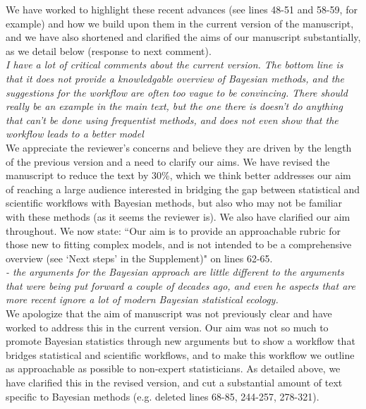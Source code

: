 \documentclass[11pt,a4paper]{article}
\begin{document}
We have worked to highlight these recent advances (see lines 48-51 and 58-59, for example) and how we build upon them in the current version of the manuscript, and we have also shortened and clarified the aims of our manuscript substantially, as we detail below (response to next comment).\\

\emph{I have a lot of critical comments about the current version. The bottom line is that it does not provide a knowledgable overview of Bayesian methods, and the suggestions for the workflow are often too vague to be convincing. There should really be an example in the main text, but the one there is doesn't do anything that can't be done using frequentist methods, and does not even show that the workflow leads to a better model}\\

We appreciate the reviewer's concerns and believe they are driven by the length of the previous version and a need to clarify our aims. We have revised the manuscript to reduce the text by 30\%, which we think better addresses our aim of reaching a large audience interested in bridging the gap between statistical and scientific workflows with Bayesian methods, but also who may not be familiar with these methods (as it seems the reviewer is). We also have clarified our aim throughout.  We now state: ``Our
aim is to provide an approachable rubric for those new to fitting complex models, and is not intended to be a comprehensive overview (see ‘Next steps’ in the Supplement)" on lines 62-65.\\

\emph{- the arguments for the Bayesian approach are little different to the arguments that were being put forward a couple of decades ago, and even he aspects that are more recent ignore a lot of modern Bayesian statistical ecology.}\\

We apologize that the aim of manuscript was not previously clear and have worked to address this in the current version. Our aim was not so much to promote Bayesian statistics through new arguments but to show a workflow that bridges statistical and scientific workflows, and to make this workflow we outline as approachable as possible to non-expert statisticians. As detailed above, we have clarified this in the revised version, and cut a substantial amount of text specific to Bayesian methods (e.g. deleted lines 68-85, 244-257, 278-321).\\
\end{document}

